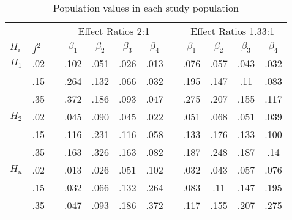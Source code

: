 \documentclass[11pt, a4paper]{article} %
\begin{document}
\begin{table}[ht]
	\centering
	\caption{Population values in each study population}
	\label{my-label}
	\begin{tabular}{cccccccccccc}
		\hline
		\multicolumn{1}{l}{}      & \multicolumn{1}{l}{}      & \multicolumn{1}{l}{} & \multicolumn{4}{c}{Effect Ratios 2:1}         & \multicolumn{1}{l}{} & \multicolumn{4}{c}{Effect Ratios 1.33:1}      \\
		\multicolumn{1}{l}{$H_i$} & \multicolumn{1}{l}{$f^2$} & \multicolumn{1}{l}{} & $\beta_1$ & $\beta_2$ & $\beta_3$ & $\beta_4$ & \multicolumn{1}{l}{} & $\beta_1$ & $\beta_2$ & $\beta_3$ & $\beta_4$ \\ \cline{1-2} \cline{4-7} \cline{9-12} 
		$H_1$                     & .02                      &                      & .102     & .051     & .026     & .013     &                      & .076     & .057     & .043     & .032     \\
		& .15                      &                      & .264     & .132     & .066     & .032     &                      & .195     & .147     & .11      & .083     \\
		& .35                      &                      & .372     & .186     & .093     & .047     &                      & .275     & .207     & .155     & .117     \\
		$H_2$                     & .02                      &                      & .045     & .090      & .045     & .022     &                      & .051     & .068     & .051     & .039     \\
		& .15                      &                      & .116     & .231     & .116     & .058     &                      & .133     & .176     & .133     & .100       \\
		& .35                      &                      & .163     & .326     & .163     & .082     &                      & .187     & .248     & .187     & .14      \\
		$H_u$                     & .02                      &                      & .013     & .026     & .051     & .102     &                      & .032     & .043     & .057     & .076     \\
		& .15                      &                      & .032     & .066     & .132     & .264     &                      & .083     & .11      & .147     & .195     \\
		& .35                      &                      & .047     & .093     & .186     & .372     &                      & .117     & .155     & .207     & .275     \\ \hline
	\end{tabular}
\end{table}
\end{document}
